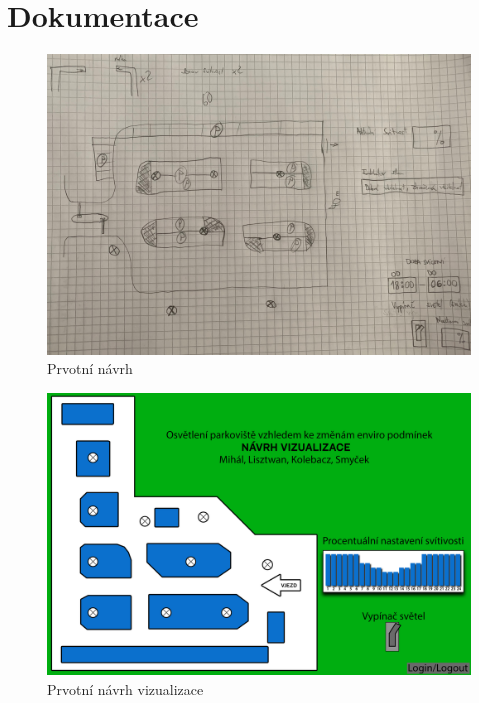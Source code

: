 \chapter{Dokumentace}


\begin{figure}[ht]
    \centering\includegraphics[width=.8\textwidth]{Figures/Pap.jpg}   
    \caption{Prvotní návrh}
    \label{Obr-Pap}
\end{figure}

\begin{figure}[ht]
    \centering\includegraphics[height=.9\textwidth,angle=-90]{Figures/Navrh-viz.png}   
    \caption{Prvotní návrh vizualizace}
    \label{Obr-Navrh-viz-01}
\end{figure}



\endinput
